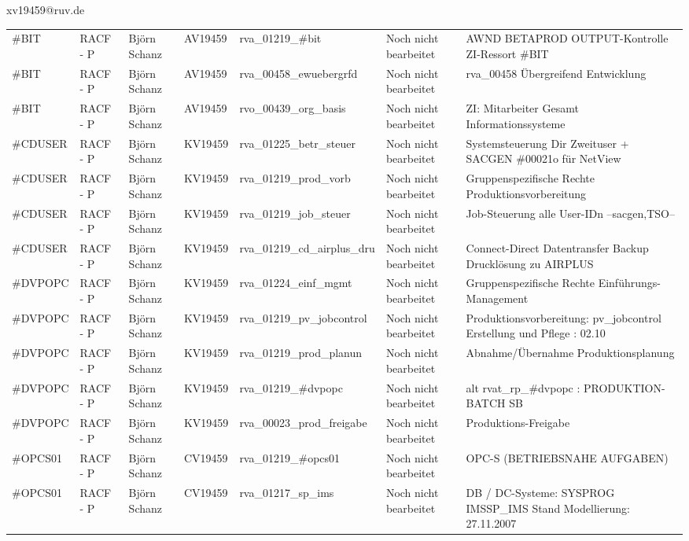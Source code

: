 \documentclass[a4paper,landscape,12pt]{letter}
\begin{document}
\begin{letter}{xv19459@ruv.de\hfill \break}
\begin{tiny}
\begin{longtable}{|p{35mm}|p{15mm}|p{25mm}|p{10mm}|p{40mm}|p{50mm}|p{50mm}|}
\#BIT & RACF - P & Björn Schanz & AV19459 & rva\_01219\_\#bit & Noch nicht bearbeitet & AWND BETAPROD OUTPUT-Kontrolle ZI-Ressort \#BIT \\
\#BIT & RACF - P & Björn Schanz & AV19459 & rva\_00458\_ewuebergrfd & Noch nicht bearbeitet & rva\_00458 Übergreifend Entwicklung \\
\#BIT & RACF - P & Björn Schanz & AV19459 & rvo\_00439\_org\_basis & Noch nicht bearbeitet & ZI: Mitarbeiter Gesamt Informationssysteme \\
\#CDUSER & RACF - P & Björn Schanz & KV19459 & rva\_01225\_betr\_steuer & Noch nicht bearbeitet & Systemsteuerung Dir Zweituser + SACGEN \#00021o für NetView \\
\#CDUSER & RACF - P & Björn Schanz & KV19459 & rva\_01219\_prod\_vorb & Noch nicht bearbeitet & Gruppenspezifische Rechte Produktionsvorbereitung \\
\#CDUSER & RACF - P & Björn Schanz & KV19459 & rva\_01219\_job\_steuer & Noch nicht bearbeitet & Job-Steuerung alle User-IDn --sacgen,TSO-- \\
\#CDUSER & RACF - P & Björn Schanz & KV19459 & rva\_01219\_cd\_airplus\_dru & Noch nicht bearbeitet & Connect-Direct Datentransfer Backup Drucklösung zu AIRPLUS \\
\#DVPOPC & RACF - P & Björn Schanz & KV19459 & rva\_01224\_einf\_mgmt & Noch nicht bearbeitet & Gruppenspezifische Rechte Einführungs-Management \\
\#DVPOPC & RACF - P & Björn Schanz & KV19459 & rva\_01219\_pv\_jobcontrol & Noch nicht bearbeitet & Produktionsvorbereitung: pv\_jobcontrol Erstellung und Pflege : 02.10 \\
\#DVPOPC & RACF - P & Björn Schanz & KV19459 & rva\_01219\_prod\_planun & Noch nicht bearbeitet & Abnahme/Übernahme Produktionsplanung \\
\#DVPOPC & RACF - P & Björn Schanz & KV19459 & rva\_01219\_\#dvpopc & Noch nicht bearbeitet & alt rvat\_rp\_\#dvpopc          : PRODUKTION-BATCH SB \\
\#DVPOPC & RACF - P & Björn Schanz & KV19459 & rva\_00023\_prod\_freigabe & Noch nicht bearbeitet & Produktions-Freigabe \\
\#OPCS01 & RACF - P & Björn Schanz & CV19459 & rva\_01219\_\#opcs01 & Noch nicht bearbeitet & OPC-S (BETRIEBSNAHE AUFGABEN) \\
\#OPCS01 & RACF - P & Björn Schanz & CV19459 & rva\_01217\_sp\_ims & Noch nicht bearbeitet & DB / DC-Systeme:  SYSPROG IMSSP\_IMS Stand Modellierung: 27.11.2007 \\

\end{longtable}
\end{tiny}
\end{letter}
\end{document}
